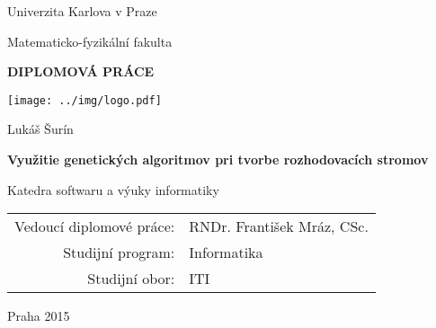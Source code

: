 \documentclass[12pt,a4paper]{report}
\begin{document}


\pagestyle{empty}
\begin{center}

\large

Univerzita Karlova v Praze

\medskip

Matematicko-fyzikální fakulta

\vfill

{\bf\Large DIPLOMOVÁ PRÁCE}

\vfill

\centerline{\mbox{\texttt{[image: ../img/logo.pdf]}}}

\vfill
\vspace{5mm}

{\LARGE Lukáš Šurín}

\vspace{15mm}

{\LARGE\bfseries Využitie genetických algoritmov pri tvorbe rozhodovacích stromov}

\vfill

Katedra softwaru a výuky informatiky

\vfill

\begin{tabular}{rl}

Vedoucí diplomové práce: & RNDr. František Mráz, CSc. \\
\noalign{\vspace{2mm}}
Studijní program: & Informatika \\
\noalign{\vspace{2mm}}
Studijní obor: & ITI \\
\end{tabular}

\vfill

Praha 2015

\end{center}

\newpage


\end{document}
